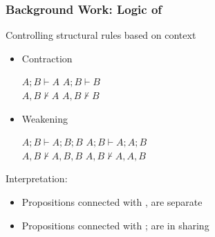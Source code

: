 \begin{frame}[c]
  \frametitle{Background Work: Logic of \BI{}}
  \begin{center}
  Controlling structural rules based on context

  \begin{itemize}

\item Contraction
  \begin{center}
   $A;B \vdash A$ \qquad $A;B \vdash B$\\
   $A,B \not\vdash A$ \qquad $A,B \not\vdash B$
 \end{center}
 \item Weakening
  \begin{center}
   $A;B \vdash A;B;B$ \qquad $A;B \vdash A;A;B$\\
   $A,B \not\vdash A,B,B$ \qquad $A,B \not\vdash A,A,B$
 \end{center}
\end{itemize}
  Interpretation:
  \begin{itemize}
  \item Propositions connected with , are separate
  \item Propositions connected with ; are in sharing
\end{itemize}
\end{center}

\end{frame}

